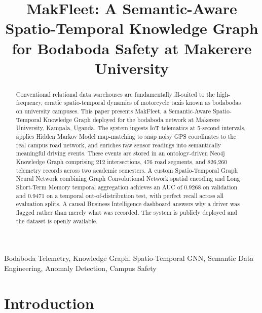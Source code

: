 \documentclass[conference]{IEEEtran}
\begin{document}
\title{MakFleet: A Semantic-Aware Spatio-Temporal Knowledge Graph
for Bodaboda Safety at Makerere University}

\author{
}

\maketitle

\begin{abstract}
Conventional relational data warehouses are fundamentally ill-suited
to the high-frequency, erratic spatio-temporal dynamics of motorcycle
taxis known as bodabodas on university campuses. This paper presents
MakFleet, a Semantic-Aware Spatio-Temporal Knowledge Graph deployed
for the bodaboda network at Makerere University, Kampala, Uganda.
The system ingests IoT telematics at 5-second intervals, applies
Hidden Markov Model map-matching to snap noisy GPS coordinates to
the real campus road network, and enriches raw sensor readings into
semantically meaningful driving events. These events are stored in an
ontology-driven Neo4j Knowledge Graph comprising 212 intersections,
476 road segments, and 826,260 telemetry records across two academic
semesters. A custom Spatio-Temporal Graph Neural Network combining
Graph Convolutional Network spatial encoding and Long Short-Term
Memory temporal aggregation achieves an AUC of 0.9268 on validation
and 0.9471 on a temporal out-of-distribution test, with perfect
recall across all evaluation splits. A causal Business Intelligence
dashboard answers why a driver was flagged rather than merely what
was recorded. The system is publicly deployed and the dataset is
openly available.
\end{abstract}

\begin{IEEEkeywords}
Bodaboda Telemetry, Knowledge Graph, Spatio-Temporal GNN,
Semantic Data Engineering, Anomaly Detection, Campus Safety
\end{IEEEkeywords}


\section{Introduction}
\end{document}
